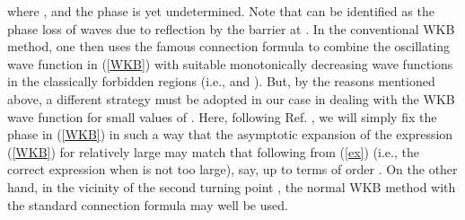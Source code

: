 \documentclass[a4paper,aps,eqsecnum,preprint,preprintnumbers,12pt]{revtex4}
\begin{document}
where \coordHE{}, and the phase \myHighlight{$\phi$}\coordHE{} is yet undetermined. Note
that \myHighlight{$2\phi$}\coordHE{} can be identified as the phase loss of waves due to
reflection by the barrier at \coordHE{}. In the conventional WKB
method, one then uses the famous connection formula to combine the
oscillating wave function in (\ref{WKB}) with suitable
monotonically decreasing wave functions in the classically
forbidden regions (i.e., \coordHE{} and \coordHE{}). But, by the
reasons mentioned above, a different strategy must be adopted in
our case in dealing with the WKB wave function for small values of
\coordHE{}. Here, following Ref. \cite{friedrich}, we will simply fix the
phase \myHighlight{$\phi$}\coordHE{} in (\ref{WKB}) in such a way that the asymptotic
expansion of the expression (\ref{WKB}) for relatively large \coordHE{}
may match that following from (\ref{ex}) (i.e., the correct
expression when \coordHE{} is not too large), say, up to terms of order
\coordHE{}. On the other hand, in the
vicinity of the second turning point \coordHE{}, the normal WKB
method with the standard connection formula may well be used.
\end{document}
